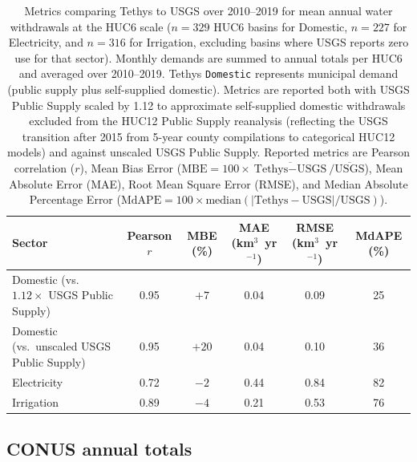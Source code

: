 \documentclass[fleqn,10pt]{wlscirep}
\begin{document}
\begin{table}[!ht]
\centering
\small
\begin{tabular}{lccccc}
\toprule
\textbf{Sector} & \textbf{Pearson $r$} & \textbf{MBE (\%)} & \textbf{MAE (km$^3$~yr$^{-1}$)} & \textbf{RMSE (km$^3$~yr$^{-1}$)} & \textbf{MdAPE (\%)} \\
\midrule
Domestic (vs.\ $1.12\times$ USGS Public Supply) & 0.95 & $+7$  & 0.04 & 0.09 & 25 \\
Domestic (vs.\ unscaled USGS Public Supply)     & 0.95 & $+20$ & 0.04 & 0.10 & 36 \\
Electricity                                     & 0.72 & $-2$  & 0.44 & 0.84 & 82 \\
Irrigation                                      & 0.89 & $-4$  & 0.21 & 0.53 & 76 \\
\bottomrule
\end{tabular}
\caption{Metrics comparing Tethys to USGS over 2010--2019 for mean annual water withdrawals at the HUC6 scale ($n=329$ HUC6 basins for Domestic, $n=227$ for Electricity, and $n=316$ for Irrigation, excluding basins where USGS reports zero use for that sector). Monthly demands are summed to annual totals per HUC6 and averaged over 2010--2019. Tethys \texttt{Domestic} represents municipal demand (public supply plus self-supplied domestic). Metrics are reported both with USGS Public Supply scaled by 1.12 to approximate self-supplied domestic withdrawals excluded from the HUC12 Public Supply reanalysis\cite{Stets2025USGS,Alzraiee2024WRR,Luukkonen2023USGS} (reflecting the USGS transition after 2015 from 5-year county compilations to categorical HUC12 models) and against unscaled USGS Public Supply. Reported metrics are Pearson correlation ($r$), Mean Bias Error ($\mathrm{MBE} = 100 \times \overline{\text{Tethys}-\text{USGS}} / \overline{\text{USGS}}$), Mean Absolute Error (MAE), Root Mean Square Error (RMSE), and Median Absolute Percentage Error ($\mathrm{MdAPE} = 100 \times \mathrm{median}(|\text{Tethys}-\text{USGS}|/\text{USGS})$).}
\label{tab:validation-metrics}
\end{table}

\subsection*{CONUS annual totals}
\end{document}
